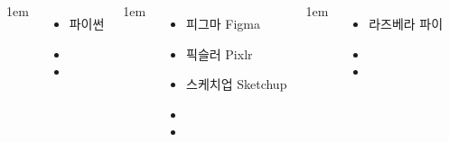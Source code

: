 \documentclass[	17pt, 
							a2paper, 
							landscape,
							margin=0mm, %
							innermargin=10mm,  		%
							blockverticalspace=4mm, %
							colspace=5mm, 
							subcolspace=0mm
							]{tikzposter}
\begin{document}
\begin{columns}

			{
					\setlength{\labelsep} {1em}
					\begin{itemize}
					\item 파이썬
					\item 
					\item 
					\end{itemize}
			} %


			{
					\setlength{\labelsep} {1em}
					\begin{itemize}
					\item 피그마  Figma

					\item 픽슬러  Pixlr

					\item 스케치업 Sketchup
					\item 
					\item 
					\end{itemize}
			} %






			{
					\setlength{\labelsep} {1em}
					\begin{itemize}
					\item 라즈베라 파이
					\item 
					\item 
					\end{itemize}
			} %



\end{columns}
\end{document}
